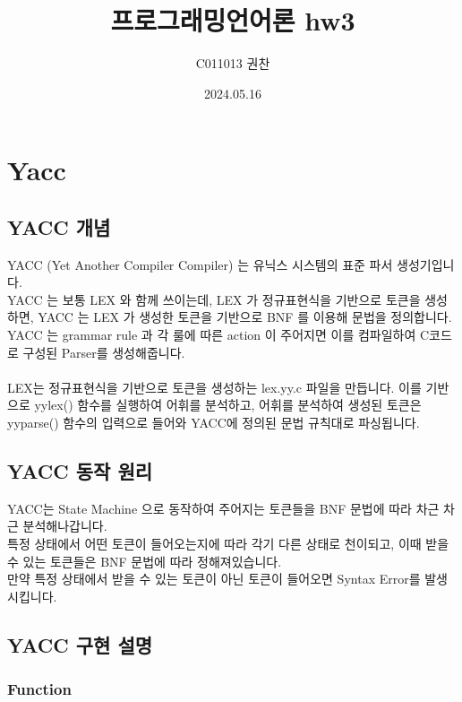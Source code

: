 \documentclass{article}
\title{프로그래밍언어론 hw3}
\author{C011013 권찬}
\date{2024.05.16}
\begin{document}
\maketitle

\section{Yacc}
\subsection{YACC 개념}
YACC (Yet Another Compiler Compiler) 는 유닉스 시스템의 표준 파서 생성기입니다.\\
YACC 는 보통 LEX 와 함께 쓰이는데, LEX 가 정규표현식을 기반으로 토큰을 생성하면, YACC 는 LEX 가 생성한 토큰을 기반으로 BNF 를 이용해 문법을 정의합니다.\\
YACC 는 grammar rule 과 각 룰에 따른 action 이 주어지면 이를 컴파일하여 C코드로 구성된 Parser를 생성해줍니다.\\\\
LEX는 정규표현식을 기반으로 토큰을 생성하는 lex.yy.c 파일을 만듭니다. 이를 기반으로 yylex() 함수를 실행하여 어휘를 분석하고, 어휘를 분석하여 생성된 토큰은 yyparse() 함수의 입력으로 들어와 YACC에 정의된 문법 규칙대로 파싱됩니다.

\subsection{YACC 동작 원리}
YACC는 State Machine 으로 동작하여 주어지는 토큰들을 BNF 문법에 따라 차근 차근 분석해나갑니다.\\
특정 상태에서 어떤 토큰이 들어오는지에 따라 각기 다른 상태로 천이되고, 이때 받을 수 있는 토큰들은 BNF 문법에 따라 정해져있습니다.\\
만약 특정 상태에서 받을 수 있는 토큰이 아닌 토큰이 들어오면 Syntax Error를 발생시킵니다.

\subsection{YACC 구현 설명}
\subsubsection{Function}
\end{document}
